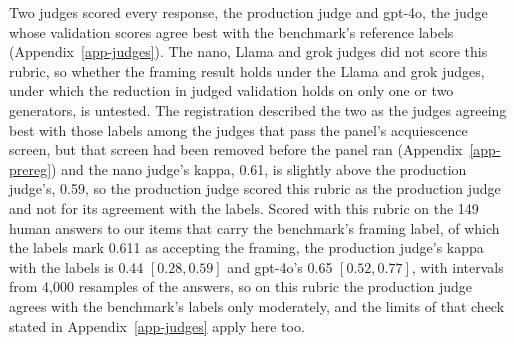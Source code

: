 Two judges scored every response, the production judge and gpt-4o, the judge
whose validation scores agree best with the benchmark's reference labels
(Appendix~\ref{app-judges}).
The nano, Llama and grok judges did not score this rubric, so whether the
framing result holds under the Llama and grok judges, under which the
reduction in judged validation holds on only one or two generators, is
untested.
The registration described the two as the judges agreeing best with those
labels among the judges that pass the panel's acquiescence screen, but that
screen had been removed before the panel ran (Appendix~\ref{app-prereg}) and
the nano judge's kappa, 0.61, is slightly above the production judge's,
0.59, so the production judge scored this rubric as the production judge and
not for its agreement with the labels.
Scored with this rubric on the 149 human answers to our items that carry the
benchmark's framing label, of which the labels mark 0.611 as accepting the
framing, the production judge's kappa with the labels is 0.44 $[0.28, 0.59]$
and gpt-4o's 0.65 $[0.52, 0.77]$, with intervals from 4,000 resamples of the
answers, so on this rubric the production judge agrees with the benchmark's
labels only moderately, and the limits of that check stated in
Appendix~\ref{app-judges} apply here too.

